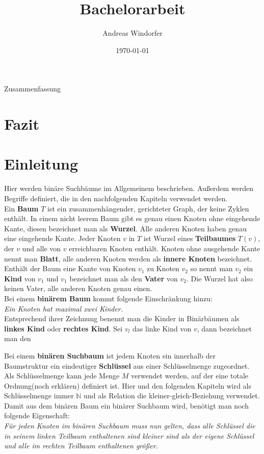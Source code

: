\documentclass[a4paper,12pt]{article}
\title{Bachelorarbeit}
\author{

	Andreas Windorfer\\
}
\date{\today}
\begin{document}
\maketitle
\newpage
Zusammenfassung
\newpage
\tableofcontents


\newpage

\section{Fazit}
\section {Einleitung}
Hier werden binäre Suchbäume im Allgemeinem beschrieben. Außerdem werden Begriffe definiert, die in den nachfolgenden Kapiteln verwendet werden.\\
Ein \textbf{Baum} $T$ ist ein zusammenhängender, gerichteter Graph, der keine Zyklen enthält. In einem nicht leerem Baum gibt es genau einen Knoten ohne eingehende Kante, diesen bezeichnet man als \textbf{Wurzel}. Alle anderen Knoten haben genau eine eingehende Kante. Jeder Knoten $v$ in $T$ ist Wurzel eines \textbf{Teilbaumes} $T(v)$, der $v$ und alle von $v$ erreichbaren Knoten enthält. Knoten ohne ausgehende Kante nennt man \textbf{Blatt}, alle anderen Knoten werden als \textbf{innere Knoten} bezeichnet.  Enthält der Baum eine Kante von Knoten $v_1$ zu Knoten $v_2$ so nennt man $v_2$ ein \textbf{Kind} von $v_1$ und $v_1$ bezeichnet man als den  \textbf{Vater} von $v_2$. Die Wurzel hat also keinen Vater, alle anderen Knoten genau einen.\\
Bei einem \textbf{binärem Baum} kommt folgende Einschränkung hinzu:  \\
\textit{Ein Knoten hat maximal zwei Kinder.}\\ 
Entsprechend ihrer Zeichnung benennt man die Kinder in Binärbäumen als \textbf{linkes Kind} oder \textbf{rechtes Kind}. Sei $v_l$ das linke Kind von $v$, dann bezeichnet man den  


\noindent Bei einem \textbf{binären Suchbaum} ist jedem Knoten ein innerhalb der Baumstruktur ein eindeutiger \textbf{Schlüssel} aus einer Schlüsselmenge zugeordnet. Als Schlüsselmenge kann jede Menge $M$ verwendet werden, auf der eine totale Ordnung(noch erklären) definiert ist. Hier und den folgenden Kapiteln wird als Schlüsselmenge immer $\mathbb{N}$ und als Relation die kleiner-gleich-Beziehung verwendet. Damit aus dem binären Baum ein binärer Suchbaum wird, benötigt man noch folgende Eigenschaft:\\
\textit{Für jeden Knoten im binären Suchbaum muss nun gelten, dass alle Schlüssel die in seinem linken Teilbaum enthaltenen sind kleiner sind als der eigene Schlüssel und alle im rechten Teilbaum enthaltenen größer.} \\
\end{document}
